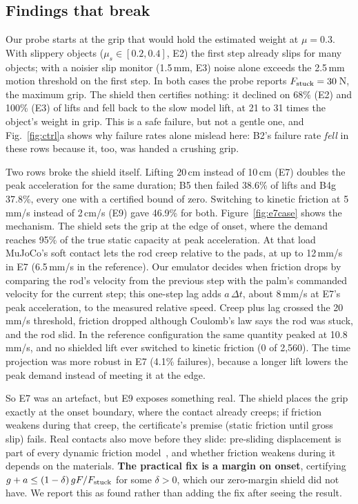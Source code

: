 \subsection{Findings that break}
 Our probe starts at the grip that would hold the
estimated weight at $\mu=0.3$. With slippery objects ($\mu_s\in[0.2,0.4]$, E2) the first step already slips for many
objects; with a noisier slip monitor (1.5\,mm, E3) noise alone exceeds the 2.5\,mm motion threshold on the first step. In
both cases the probe reports $F_{\mathrm{stuck}}=30$\,N, the maximum grip. The shield then certifies nothing: it declined on 68\% (E2) and
100\% (E3) of lifts and fell back to the slow model lift, at 21 to 31 times the object's weight in grip. This is a safe
failure, but not a gentle one, and Fig.~\ref{fig:ctrl}a shows why failure rates alone mislead here: B2's failure rate
\emph{fell} in these rows because it, too, was handed a crushing grip.

 Two rows broke the
shield itself. Lifting 20\,cm instead of 10\,cm (E7) doubles the peak acceleration for the same duration; B5 then failed
38.6\% of lifts and B4g 37.8\%, every one with a certified bound of zero. Switching to kinetic friction at 5\,mm/s instead
of 2\,cm/s (E9) gave 46.9\% for both. Figure~\ref{fig:e7case} shows the mechanism. The shield sets the grip at the edge of
onset, where the demand reaches 95\% of the true static capacity at peak acceleration. At that load MuJoCo's soft contact
lets the rod creep relative to the pads, at up to 12\,mm/s in E7 (6.5\,mm/s in the reference). Our emulator decides when
friction drops by comparing the rod's velocity from the previous step with the palm's commanded velocity for the current
step; this one-step lag adds $a\,\Delta t$, about 8\,mm/s at E7's peak acceleration, to the measured relative speed. Creep
plus lag crossed the 20\,mm/s threshold, friction dropped although Coulomb's law says the rod was stuck, and the rod slid.
In the reference configuration the same quantity peaked at 10.8\,mm/s, and no shielded lift ever switched to kinetic
friction (0 of 2{,}560). The time projection was more robust in E7 (4.1\% failures), because a longer lift lowers the peak
demand instead of meeting it at the edge.



So E7 was an artefact, but E9 exposes something real. The shield places the grip exactly at the onset boundary, where
the contact already creeps; if friction weakens during that creep, the certificate's premise (static friction until gross
slip) fails. Real contacts also move before they slide: pre-sliding displacement is part of every dynamic friction
model~\cite{canudas1995,olsson1998}, and whether friction weakens during it depends on the materials. \textbf{The practical
fix is a margin on onset}, certifying $g+a\le(1-\delta)\,gF/F_{\mathrm{stuck}}$ for some $\delta>0$, which our zero-margin shield did not
have. We report this as found rather than adding the fix after seeing the result.




